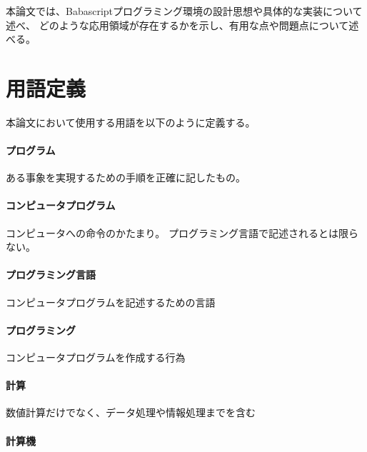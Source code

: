 本論文では、Babascriptプログラミング環境の設計思想や具体的な実装について述べ、
どのような応用領域が存在するかを示し、有用な点や問題点について述べる。

\section{用語定義}\label{ux7528ux8a9eux5b9aux7fa9}

本論文において使用する用語を以下のように定義する。

\paragraph{プログラム}\label{ux30d7ux30edux30b0ux30e9ux30e0}

ある事象を実現するための手順を正確に記したもの。

\paragraph{コンピュータプログラム}\label{ux30b3ux30f3ux30d4ux30e5ux30fcux30bfux30d7ux30edux30b0ux30e9ux30e0}

コンピュータへの命令のかたまり。
プログラミング言語で記述されるとは限らない。

\paragraph{プログラミング言語}\label{ux30d7ux30edux30b0ux30e9ux30dfux30f3ux30b0ux8a00ux8a9e}

コンピュータプログラムを記述するための言語

\paragraph{プログラミング}\label{ux30d7ux30edux30b0ux30e9ux30dfux30f3ux30b0}

コンピュータプログラムを作成する行為

\paragraph{計算}\label{ux8a08ux7b97}

数値計算だけでなく、データ処理や情報処理までを含む

\paragraph{計算機}\label{ux8a08ux7b97ux6a5f}

